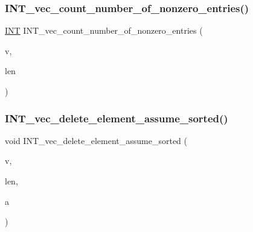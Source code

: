 \subsubsection{\texorpdfstring{I\+N\+T\+\_\+vec\+\_\+count\+\_\+number\+\_\+of\+\_\+nonzero\+\_\+entries()}{INT\_vec\_count\_number\_of\_nonzero\_entries()}}
{\footnotesize\ttfamily \mbox{\hyperlink{galois_8h_a09fddde158a3a20bd2dcadb609de11dc}{I\+NT}} I\+N\+T\+\_\+vec\+\_\+count\+\_\+number\+\_\+of\+\_\+nonzero\+\_\+entries (\begin{DoxyParamCaption}\item[{\mbox{\hyperlink{galois_8h_a09fddde158a3a20bd2dcadb609de11dc}{I\+NT}} $\ast$}]{v,  }\item[{\mbox{\hyperlink{galois_8h_a09fddde158a3a20bd2dcadb609de11dc}{I\+NT}}}]{len }\end{DoxyParamCaption})}

\mbox{\label{util_8_c_a77c3ce15fd68479344b6b6e4fd35c48b}} 
\subsubsection{\texorpdfstring{I\+N\+T\+\_\+vec\+\_\+delete\+\_\+element\+\_\+assume\+\_\+sorted()}{INT\_vec\_delete\_element\_assume\_sorted()}}
{\footnotesize\ttfamily void I\+N\+T\+\_\+vec\+\_\+delete\+\_\+element\+\_\+assume\+\_\+sorted (\begin{DoxyParamCaption}\item[{\mbox{\hyperlink{galois_8h_a09fddde158a3a20bd2dcadb609de11dc}{I\+NT}} $\ast$}]{v,  }\item[{\mbox{\hyperlink{galois_8h_a09fddde158a3a20bd2dcadb609de11dc}{I\+NT}} \&}]{len,  }\item[{\mbox{\hyperlink{galois_8h_a09fddde158a3a20bd2dcadb609de11dc}{I\+NT}}}]{a }\end{DoxyParamCaption})}

\mbox{\label{util_8_c_a58ea1abe1be41946425b30ebb8e3e2bc}} 
